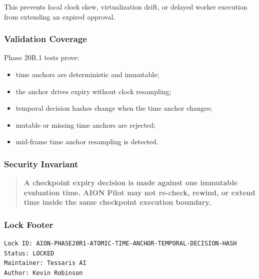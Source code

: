 This prevents local clock skew, virtualization drift, or delayed worker execution from extending an expired approval.

\subsubsection{Validation Coverage}

Phase 20R.1 tests prove:

\begin{itemize}
  \item time anchors are deterministic and immutable;
  \item the anchor drives expiry without clock resampling;
  \item temporal decision hashes change when the time anchor changes;
  \item mutable or missing time anchors are rejected;
  \item mid-frame time anchor resampling is detected.
\end{itemize}

\subsubsection{Security Invariant}

\begin{quote}
\textbf{A checkpoint expiry decision is made against one immutable evaluation time. AION Pilot may not re-check, rewind, or extend time inside the same checkpoint execution boundary.}
\end{quote}

\subsubsection{Lock Footer}

\begin{verbatim}
Lock ID: AION-PHASE20R1-ATOMIC-TIME-ANCHOR-TEMPORAL-DECISION-HASH
Status: LOCKED
Maintainer: Tessaris AI
Author: Kevin Robinson
\end{verbatim}
